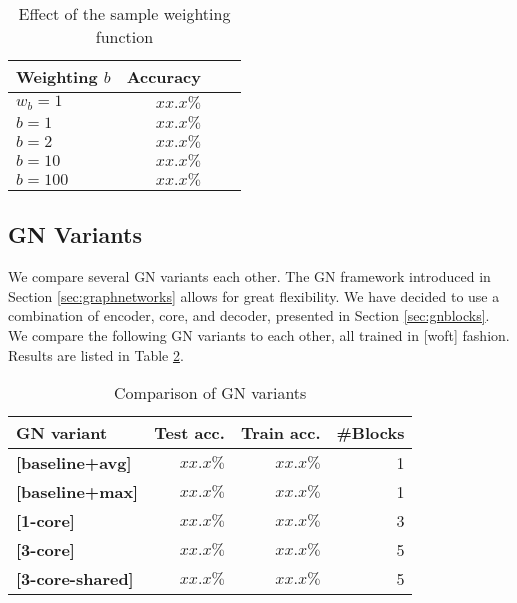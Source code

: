\begin{table}
    \centering
    \begin{tabular}{lrrr}
        \textbf{Weighting $b$} & \textbf{Accuracy}\\\hline
        $w_b=1$ & $xx.x\%$\\
        $b=1$ & $xx.x\%$\\
        $b=2$ & $xx.x\%$\\
        $b=10$ & $xx.x\%$\\
        $b=100$ & $xx.x\%$\\
    \end{tabular}
    \caption[Effect of the sample weighting function]{Effect of the sample weighting function}
    \label{tab:weightingbase}
\end{table}

\subsection{GN Variants}

We compare several GN variants each other. The GN framework introduced in Section \ref{sec:graphnetworks} allows for great flexibility. We have decided to use a combination of encoder, core, and decoder, presented in Section \ref{sec:gnblocks}.
We compare the following GN variants to each other, all trained in [woft] fashion. Results are listed in Table \ref{tab:gnvariantscomparison}.

\begin{table}
    \centering
    \begin{tabular}{lrrr}
        \textbf{GN variant} & \textbf{Test acc.} & \textbf{Train acc.} & \textbf{\#Blocks}\\\hline
        \textbf{[baseline+avg]} & $xx.x\%$ & $xx.x\%$ & 1\\
        \textbf{[baseline+max]} & $xx.x\%$ & $xx.x\%$ & 1\\
        \textbf{[1-core]} & $xx.x\%$ & $xx.x\%$ & 3\\
        \textbf{[3-core]} & $xx.x\%$ & $xx.x\%$ & 5\\
        \textbf{[3-core-shared]} & $xx.x\%$ & $xx.x\%$ & 5\\
    \end{tabular}
    \caption[Comparison of GN variants]{Comparison of GN variants}
    \label{tab:gnvariantscomparison}
\end{table}

